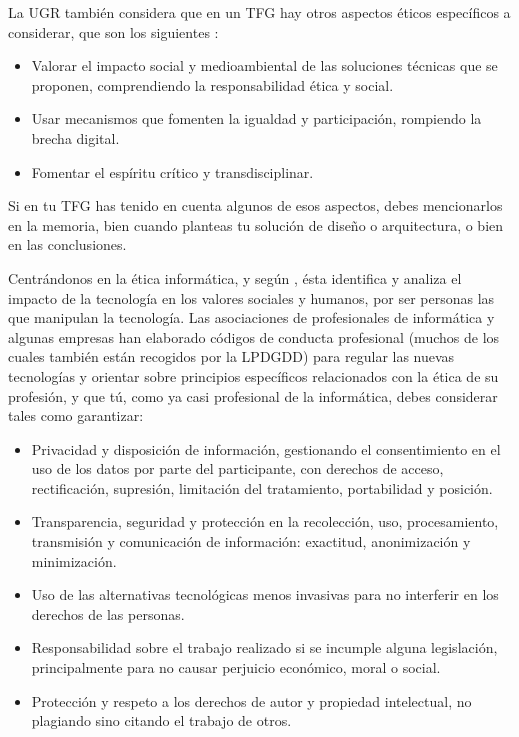 La UGR también considera que en un TFG hay otros aspectos éticos específicos a considerar, que son los siguientes \cite{EticaUGR}:
\begin{itemize}
    \item Valorar el impacto social y medioambiental de las soluciones técnicas que se proponen, comprendiendo la responsabilidad ética y social.
    \item Usar mecanismos que fomenten la igualdad y participación, rompiendo la brecha digital.
    \item Fomentar el espíritu crítico y transdisciplinar.
\end{itemize}

Si en tu TFG has tenido en cuenta algunos de esos aspectos, debes mencionarlos en la memoria, bien cuando planteas tu solución de diseño o arquitectura, o bien en las conclusiones.

Centrándonos en la ética informática, y según \cite{bynum2000}, ésta identifica y analiza el impacto de la tecnología en los valores sociales y humanos, por ser personas las que manipulan la tecnología. Las asociaciones de profesionales de informática y algunas empresas han elaborado códigos de conducta profesional (muchos de los cuales también están recogidos por la LPDGDD) para regular las nuevas tecnologías y orientar sobre principios específicos relacionados con la ética de su profesión, y que tú, como ya casi profesional de la informática, debes considerar tales como garantizar:  
\begin{itemize}
    \item Privacidad y disposición de información, gestionando el consentimiento en el uso de los datos por parte del participante, con derechos de acceso, rectificación, supresión, limitación del tratamiento, portabilidad y posición.
    \item Transparencia, seguridad y protección en la recolección, uso, procesamiento, transmisión y comunicación de información: exactitud, anonimización y minimización. 
    \item Uso de las alternativas tecnológicas menos invasivas para no interferir en los derechos de las personas.
    \item Responsabilidad sobre el trabajo realizado si se incumple alguna legislación, principalmente para no causar perjuicio económico, moral o social.
    \item Protección y respeto a los derechos de autor y propiedad intelectual, no plagiando sino citando el trabajo de otros.
\end{itemize}



